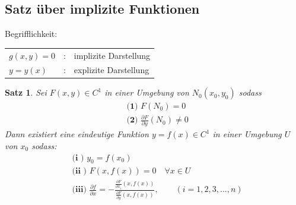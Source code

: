 \documentclass[12pt,a4paper]{report}%
\newtheorem{satz}{Satz}[section]
\numberwithin{equation}{section}
\newcommand{\diffp}{\partial}
\numberwithin{equation}{subsection}
\begin{document}
  \subsection{Satz über implizite Funktionen}
  Begrifflichkeit: \qquad
  \begin{tabular}{l l l}
    $g(x,y) = 0$ &: & implizite Darstellung \\
    $y = y(x)$ &: & explizite Darstellung  
  \end{tabular}
  \begin{satz}
    Sei $F(x,y) \in C^1$ in einer Umgebung von $N_0(x_0,y_0)$ sodass
    \begin{align*}
      &\textbf{(1) } F(N_0) = 0 \\
      &\textbf{(2) } \frac{\diffp F}{\diffp y}(N_0) \neq 0
    \end{align*}     
    Dann existiert eine eindeutige Funktion $y = f(x) \in C^1$ in einer Umgebung $U$ von $x_0$ sodass:
    \begin{align*}
      &\textbf{(i  ) } y_0 = f(x_0) \\
      &\textbf{(ii ) } F\left(x,f(x)\right) = 0 \quad \forall x \in U \\
      &\textbf{(iii) } \frac{\diffp f}{\diffp x} = - \frac{\frac{\diffp F}{\diffp x_i} \left(x, f(x)\right)}{\frac{\diffp F}{\diffp y}\left(x,f(x)\right)} ,\qquad (i = 1,2,3,...,n)
    \end{align*}
  \end{satz}
\end{document}
